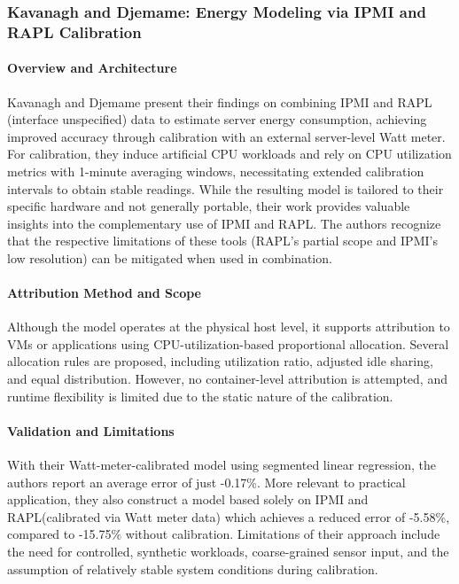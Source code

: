 \subsubsection{Kavanagh and Djemame: Energy Modeling via IPMI and RAPL Calibration}
\label{sec:kavanagh}

\paragraph{Overview and Architecture}
Kavanagh and Djemame\parencite{kavanagh2019rapid} present their findings on combining IPMI and RAPL (interface unspecified) data to estimate server energy consumption, achieving improved accuracy through calibration with an external server-level Watt meter. For calibration, they induce artificial CPU workloads and rely on CPU utilization metrics with 1-minute averaging windows, necessitating extended calibration intervals to obtain stable readings. While the resulting model is tailored to their specific hardware and not generally portable, their work provides valuable insights into the complementary use of IPMI and RAPL. The authors recognize that the respective limitations of these tools (RAPL’s partial scope and IPMI’s low resolution) can be mitigated when used in combination.

\paragraph{Attribution Method and Scope}
Although the model operates at the physical host level, it supports attribution to VMs or applications using CPU-utilization-based proportional allocation. Several allocation rules are proposed, including utilization ratio, adjusted idle sharing, and equal distribution. However, no container-level attribution is attempted, and runtime flexibility is limited due to the static nature of the calibration.

\paragraph{Validation and Limitations}
With their Watt-meter-calibrated model using segmented linear regression, the authors report an average error of just -0.17\%. More relevant to practical application, they also construct a model based solely on IPMI and RAPL(calibrated via Watt meter data) which achieves a reduced error of -5.58\%, compared to -15.75\% without calibration. Limitations of their approach include the need for controlled, synthetic workloads, coarse-grained sensor input, and the assumption of relatively stable system conditions during calibration.


